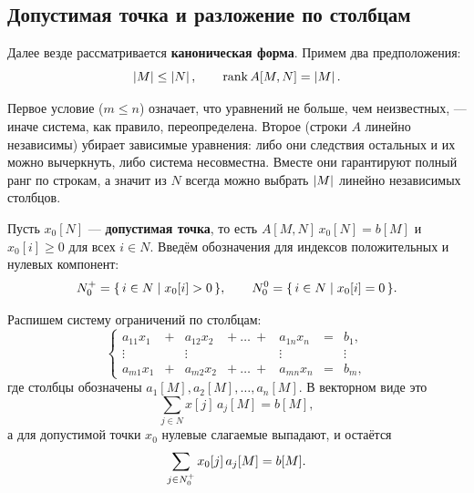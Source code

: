 \subsection{Допустимая точка и разложение по столбцам}

Далее везде рассматривается \textbf{каноническая форма}. Примем два предположения:
\[
  \left\lvert M \right\rvert \le \left\lvert N \right\rvert, \qquad \operatorname{rank} A[M,N] = \left\lvert M \right\rvert .
\]

\begin{idea}
Первое условие ($m \le n$) означает, что уравнений не больше, чем неизвестных, —
иначе система, как правило, переопределена. Второе (строки $A$ линейно независимы)
убирает зависимые уравнения: либо они следствия остальных и их можно вычеркнуть,
либо система несовместна. Вместе они гарантируют полный ранг по строкам, а значит
из $N$ всегда можно выбрать $\left\lvert M \right\rvert$ линейно независимых столбцов.
\end{idea}

Пусть $x_0[N]$ — \textbf{допустимая точка}, то есть $A[M,N]\,x_0[N] = b[M]$ и
$x_0[i] \ge 0$ для всех $i \in N$. Введём обозначения для индексов положительных и
нулевых компонент:
\[
  N_0^{+} = \{\, i \in N \mid x_0[i] > 0 \,\}, \qquad
  N_0^{0} = \{\, i \in N \mid x_0[i] = 0 \,\} .
\]

Распишем систему ограничений по столбцам:
\[
  \left\{
  \begin{array}{ccccccc}
    a_{11} x_1 &+& a_{12} x_2 &+ \ \dots \ +& a_{1n} x_n &=& b_1, \\
    \vdots & & \vdots & & \vdots & & \vdots \\
    a_{m1} x_1 &+& a_{m2} x_2 &+ \ \dots \ +& a_{mn} x_n &=& b_m,
  \end{array}
  \right.
\]
где столбцы обозначены $a_1[M], a_2[M], \dots, a_n[M]$. В векторном виде это
\[
  \sum_{j \in N} x[j]\, a_j[M] = b[M] ,
\]
а для допустимой точки $x_0$ нулевые слагаемые выпадают, и остаётся
\begin{equation}\label{eq:column-decomp}
  \sum_{j \in N_0^{+}} x_0[j]\, a_j[M] = b[M] .
\end{equation}
